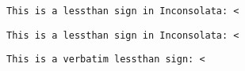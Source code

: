 \documentclass{article}
\begin{document}
\texttt{This is a lessthan sign in Inconsolata: <}

\texttt{This is a lessthan sign in Inconsolata: \textless{}}

\begin{verbatim}
This is a verbatim lessthan sign: <
\end{verbatim}
\end{document}
